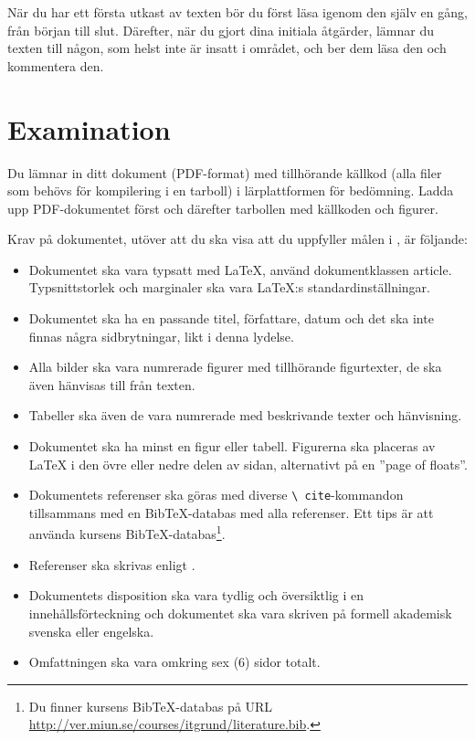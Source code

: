 \documentclass[a4paper,nocourse]{miunasgn}
\begin{document}
När du har ett första utkast av texten bör du först läsa igenom den själv en 
gång, från början till slut.
Därefter, när du gjort dina initiala åtgärder, lämnar du texten till någon, som 
helst inte är insatt i området, och ber dem läsa den och kommentera den.


\section{Examination}
\label{sec:Examination}
Du lämnar in ditt dokument (PDF-format) med tillhörande källkod (alla filer som 
behövs för kompilering i en tarboll) i lärplattformen för bedömning.
Ladda upp PDF-dokumentet först och därefter tarbollen med källkoden och 
figurer.

Krav på dokumentet, utöver att du ska visa att du uppfyller målen 
i , är följande:
\begin{itemize}
  \item Dokumentet ska vara typsatt med LaTeX, använd dokumentklassen article.
    Typsnittstorlek och marginaler ska vara LaTeX:s standardinställningar.
  \item Dokumentet ska ha en passande titel, författare, datum och det ska inte 
    finnas några sidbrytningar, likt i denna lydelse.
  \item Alla bilder ska vara numrerade figurer med tillhörande figurtexter, de 
    ska även hänvisas till från texten.
  \item Tabeller ska även de vara numrerade med beskrivande texter och 
    hänvisning.
  \item Dokumentet ska ha minst en figur eller tabell.
    Figurerna ska placeras av LaTeX i den övre eller nedre delen av sidan, 
    alternativt på en ''page of floats''.
  \item Dokumentets referenser ska göras med diverse \texttt{\textbackslash 
    cite}-kommandon tillsammans med en BibTeX-databas med alla referenser.
    Ett tips är att använda kursens BibTeX-databas\footnote{%
      Du finner kursens BibTeX-databas på URL 
      \url{http://ver.miun.se/courses/itgrund/literature.bib}.
    }.
  \item Referenser ska skrivas enligt  
    \cite{IEEEcitation}.
  \item Dokumentets disposition ska vara tydlig och översiktlig i en 
    innehållsförteckning och dokumentet ska vara skriven på formell akademisk 
    svenska eller engelska.
  \item Omfattningen ska vara omkring sex (6) sidor totalt.
\end{itemize}


\printbibliography
\end{document}
